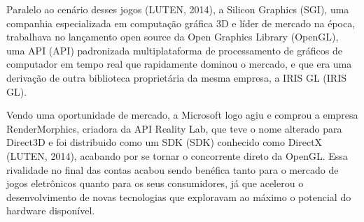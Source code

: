 Paralelo ao cenário desses jogos (LUTEN, 2014)\nocite{openGLBook}, a Silicon Graphics (\acrshort{SGI}), uma companhia especializada em computação gráfica 3D e líder de mercado na época, trabalhava no lançamento open source da Open Graphics Library (\acrshort{OpenGL}), uma API (\acrlong{API}) padronizada multiplataforma de processamento de gráficos de computador em tempo real que rapidamente dominou o mercado, e que era uma derivação de outra biblioteca proprietária da mesma empresa, a IRIS GL (\acrlong{IRIS GL}). 

Vendo uma oportunidade de mercado, a Microsoft logo agiu e comprou a empresa RenderMorphics, criadora da \acrshort{API} Reality Lab, que teve o nome alterado para Direct3D e foi distribuido como um SDK (\acrlong{SDK}) conhecido como DirectX (LUTEN, 2014)\nocite{openGLBook}, acabando por se tornar o concorrente direto da \acrshort{OpenGL}. Essa rivalidade no final das contas acabou sendo benéfica tanto para o mercado de jogos eletrônicos quanto para os seus consumidores, já que acelerou o desenvolvimento de novas tecnologias que exploravam ao máximo o potencial do hardware disponível.
	
